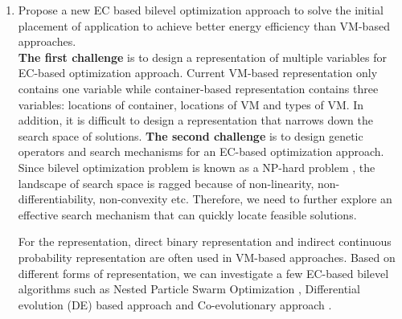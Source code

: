 \begin{enumerate}




	\item Propose a new EC based bilevel optimization approach to solve the initial placement of application to achieve better energy efficiency than VM-based approaches.\\

	 \textbf{The first challenge} is to design a representation of multiple variables for EC-based optimization approach. Current VM-based representation only contains one variable while container-based representation contains three variables: locations of container, locations of VM and types of VM. In addition, it is difficult to design a representation that narrows down the search space of solutions.  \textbf{The second challenge} is to design genetic operators and search mechanisms for an EC-based optimization approach. Since bilevel optimization problem is known as a NP-hard problem \cite{Mathieu:2011dw}, the landscape of search space is ragged because of non-linearity, non-differentiability, non-convexity etc. Therefore, we need to further explore an effective search mechanism that can quickly locate feasible solutions.

	 For the representation, direct binary representation \cite{Xu:2010vh} and indirect continuous probability representation \cite{Xiong:2014jq} are often used in VM-based approaches. 
	Based on different forms of representation, we can investigate a few EC-based bilevel algorithms such as
	Nested Particle Swarm Optimization \cite{Li:2006br}, Differential evolution (DE) based approach \cite{Angelo:2013ee, Zhu:2006in} and Co-evolutionary approach \cite{Legillon:2012dd}.


\end{enumerate}
